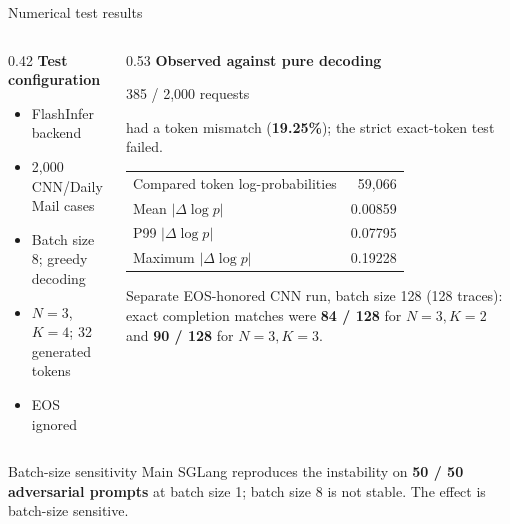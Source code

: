 \documentclass[aspectratio=169]{beamer}
\begin{document}
\begin{frame}{Numerical test results}
  \begin{columns}[T,onlytextwidth]
    \begin{column}{0.42\textwidth}
      \vspace{0.35cm}
      \textbf{Test configuration}

      \vspace{0.16cm}
      \begin{itemize}
        \setlength{\itemsep}{0.25cm}
        \item FlashInfer backend
        \item 2,000 CNN/DailyMail cases
        \item Batch size 8; greedy decoding
        \item $N=3$, $K=4$; 32 generated tokens
        \item EOS ignored
      \end{itemize}
    \end{column}
    \begin{column}{0.53\textwidth}
      \vspace{0.35cm}
      \textbf{Observed against pure decoding}

      \vspace{0.17cm}
      {\Large\textcolor{red!70!black}{385 / 2,000 requests}}

      \vspace{0.03cm}
      had a token mismatch (\textbf{19.25\%}); the strict exact-token test failed.

      \vspace{0.35cm}
      \begin{tabular}{lr}
        Compared token log-probabilities & 59,066 \\
        Mean $|\Delta \log p|$ & 0.00859 \\
        P99 $|\Delta \log p|$ & 0.07795 \\
        Maximum $|\Delta \log p|$ & 0.19228 \\
      \end{tabular}

      \vspace{0.12cm}
      {\tiny Separate EOS-honored CNN run, batch size 128 (128 traces):
      exact completion matches were \textbf{84 / 128} for $N=3,K=2$ and
      \textbf{90 / 128} for $N=3,K=3$.}
    \end{column}
  \end{columns}

  \vspace{0.18cm}
  \begin{block}{Batch-size sensitivity}
    Main SGLang reproduces the instability on \textbf{50 / 50 adversarial
    prompts} at batch size 1; batch size 8 is not stable. The effect is
    batch-size sensitive.
  \end{block}
\end{frame}
\end{document}
